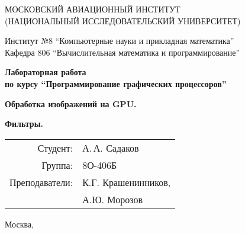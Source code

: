 \begin{titlepage}
\begin{center}

МОСКОВСКИЙ АВИАЦИОННЫЙ ИНСТИТУТ\\ (НАЦИОНАЛЬНЫЙ ИССЛЕДОВАТЕЛЬСКИЙ УНИВЕРСИТЕТ)

\vspace{18pt}

Институт №8 \enquote{Компьютерные науки и прикладная математика}\\
Кафедра 806 \enquote{Вычислительная математика и программирование}


\vspace{68pt}
\textbf{
Лабораторная работа \\ по курсу \enquote{Программирование графических процессоров}
}

\vspace{48pt}
\textbf{
Обработка изображений на GPU.
}

\vspace{28pt}
\textbf{
Фильтры.
}
\end{center}

\vspace{132pt}

\begin{flushright}
\begin{tabular}{rl}
Студент: & А.\,А. Садаков \\
Группа: & 8О-406Б \\
Преподаватели: & К.Г. Крашенинников,\\
 & А.Ю. Морозов\\
\end{tabular}
\end{flushright}

\vfill

\begin{center}
Москва, \the\year
\end{center}
\end{titlepage}

\pagebreak
